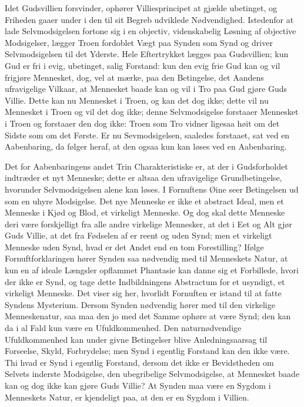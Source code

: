 \documentclass[12pt]{book}
\begin{document}
Idet Gudsvillien forsvinder, ophører Villiesprincipet at gjælde
ubetinget, og Friheden gaaer under i den til sit Begreb udviklede
Nødvendighed. Istedenfor at lade Selvmodsigelsen fortone sig i en
objectiv, videnskabelig Løsning af objective Modsigelser, lægger
Troen fordoblet Vægt paa Synden som Synd og driver Selvmodsigelsen
til det Yderste. Hele Eftertrykket lægges paa Gudsvillien; kun Gud
er fri i evig, ubetinget, salig Forstand: kun den evig frie Gud kan
og vil frigjøre Mennesket, dog, vel at mærke, paa den Betingelse,
det Aandens ufravigelige Vilkaar, at Mennesket baade kan og vil i
Tro paa
Gud gjøre Guds Villie. Dette kan nu Mennesket i Troen, og kan det
dog ikke; dette vil nu Mennesket i Troen og vil det dog ikke; denne
Selvmodsigelse forstaaer Mennesket i Troen og forstaaer den dog
ikke: Troen som Tro vidner ligesaa høit om det Sidste som om det
Første. Er nu Sevmodsigelsen, saaledes forstaaet, sat ved en
Aabenbaring, da følger heraf, at den ogsaa kun kan løses ved en
Aabenbaring.

Det for Aabenbaringens andet Trin Charakteristiske er, at der i
Gudsforholdet indtræder et nyt Menneske; dette er altsaa den
ufravigelige Grundbetingelse, hvorunder Selvmodsigelsen alene kan
løses. I Fornuftens Øine seer Betingelsen ud som en uhyre
Modsigelse. Det nye Menneske er ikke et abstract Ideal, men et
Menneske i Kjød og Blod, et virkeligt Menneske. Og dog skal dette
Menneske deri være forskjelligt fra alle andre virkelige Mennesker,
at det i Eet og Alt gjør Guds Villie, at det fra Fødselen af er
reent og uden Synd; men et virkeligt Menneske uden Synd, hvad er det
Andet end en tom Forestilling? Ifølge Fornuftforklaringen hører
Synden saa nødvendig med til Menneskets Natur, at kun en af ideale
Længsler opflammet Phantasie kan danne sig et Forbillede, hvori der
ikke er Synd, og tage dette Indbildningens Abstractum for et
usyndigt, et virkeligt Menneske. Det viser sig her, hvorlidt
Fornuften er istand til at fatte Syndens Mysterium. Dersom Synden
nødvendig hører med til den virkelige Menneskenatur, saa maa den jo
med det Samme ophøre at være Synd; den kan da i al Fald kun være en
Ufuldkommenhed. Den naturnødvendige Ufuldkommenhed kan under givne
Betingelser blive Anledningsaarsag til Forseelse, Skyld,
Forbrydelse; men Synd i egentlig Forstand kan den ikke være. Thi
hvad er Synd i egentlig Forstand, dersom det ikke er Bevidstheden om
Selvets inderste Modsigelse, den ubegribelige Selvmodsigelse, at
Mennesket baade kan og dog ikke kan gjøre Guds Villie?
At Synden maa være en Sygdom i Menneskets Natur, er kjendeligt paa,
at den er en Sygdom i Villien.
\end{document}
